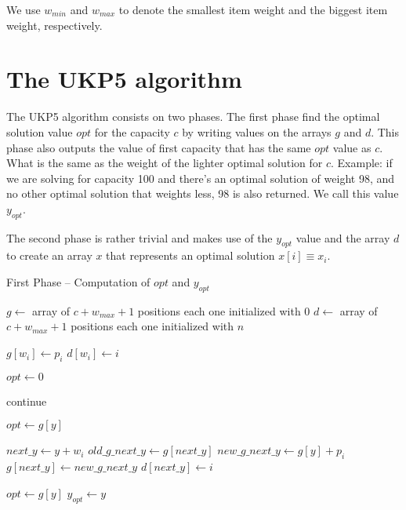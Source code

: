 \documentclass[12pt]{article}
\begin{document}
We use \(w_{min}\) and \(w_{max}\) to denote the smallest item weight and the biggest item weight, respectively.

\section{The UKP5 algorithm}

The UKP5 algorithm consists on two phases. The first phase find the optimal solution value \(opt\) for the capacity \(c\) by writing values on the arrays \(g\) and \(d\). This phase also outputs the value of first capacity that has the same \(opt\) value as \(c\). What is the same as the weight of the lighter optimal solution for \(c\). Example: if we are solving for capacity 100 and there's an optimal solution of weight 98, and no other optimal solution that weights less, 98 is also returned. We call this value \(y_{opt}\).

The second phase is rather trivial and makes use of the \(y_{opt}\) value and the array \(d\) to create an array \(x\) that represents an optimal solution \(x[i] \equiv x_i\).

\begin{algorithm}
\caption{First Phase -- Computation of $opt$ and $y_{opt}$}\label{alg:ukp6_write_phase}
\begin{algorithmic}[1]
  \State \(g \gets\) array of \(c + w_{max} + 1\) positions each one initialized with \(0\)\label{create_g}
  \State \(d \gets\) array of \(c + w_{max} + 1\) positions each one initialized with \(n\)\label{create_d}
  
  \label{begin_trivial_bounds}
      \State \(g[w_i] \gets p_i\)
      \State \(d[w_i] \gets i\)
    \EndIf
  \EndFor\label{end_trivial_bounds}

  \State \(opt \gets 0\)\label{init_opt}

  \label{main_ext_loop_begin}
    \label{if_less_than_opt_begin}
    	\State continue
    \EndIf\label{if_less_than_opt_end}
    
    \State \(opt \gets g[y]\)\label{update_opt}
    
    \label{main_inner_loop_begin}
      \State \(next\_y \gets y + w_i\)\label{calc_values_begin}
      \State \(old\_g\_next\_y \gets g[next\_y]\)
      \State \(new\_g\_next\_y \gets g[y] + p_i\)\label{calc_values_end}
      \label{if_new_lower_bound_begin}
        \State \(g[next\_y] \gets new\_g\_next\_y\)
        \State \(d[next\_y] \gets i\)
      \EndIf\label{if_new_lower_bound_end}
    \EndFor\label{main_inner_loop_end}
  \EndFor\label{main_ext_loop_end}

  \label{get_y_opt_loop_begin}
    \label{last_loop_inner_if}
      \State \(opt \gets g[y]\)
      \State \(y_{opt} \gets y\)
    \EndIf
  \EndFor\label{get_y_opt_loop_end}
\EndProcedure
\end{algorithmic}
\end{algorithm}
\end{document}
